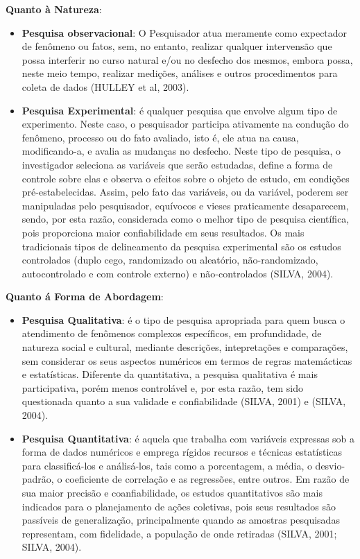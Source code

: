 \textbf{Quanto à Natureza}: 

\begin{itemize}
\item \textbf{Pesquisa observacional}: O Pesquisador atua meramente como expectador de fenômeno ou fatos, sem, no entanto, realizar qualquer intervensão que possa interferir no curso natural e/ou no desfecho dos mesmos, embora possa, neste meio tempo, realizar medições, análises e outros procedimentos para coleta de dados (HULLEY et al, 2003).
\item \textbf{Pesquisa Experimental}: é qualquer pesquisa que envolve algum tipo de experimento. Neste caso, o pesquisador participa ativamente na condução do fenômeno, processo ou do fato avaliado, isto é, ele atua na causa, modificando-a, e avalia as mudanças no desfecho. Neste tipo de pesquisa, o investigador seleciona as variáveis que serão estudadas, define a forma de controle sobre elas e observa o efeitos sobre o objeto de estudo, em condições pré-estabelecidas. Assim, pelo fato das variáveis, ou da variável, poderem ser manipuladas pelo pesquisador, equívocos e vieses praticamente  desaparecem, sendo, por esta razão, considerada como o melhor tipo de pesquisa científica, pois proporciona maior confiabilidade em seus resultados. Os mais tradicionais tipos de delineamento da pesquisa experimental são os estudos controlados (duplo cego, randomizado ou aleatório, não-randomizado, autocontrolado e com controle externo) e não-controlados (SILVA, 2004). 
\end{itemize}


\textbf{Quanto á Forma de Abordagem}: 

\begin{itemize}
\item \textbf{Pesquisa Qualitativa}: é o tipo de pesquisa apropriada para quem busca o atendimento de fenômenos complexos específicos, em profundidade, de natureza social e cultural, mediante descrições, intepretações e comparações, sem considerar os seus aspectos numéricos em termos de regras matemácticas e estatísticas. Diferente da quantitativa, a pesquisa qualitativa é mais participativa, porém menos controlável e, por esta razão, tem sido questionada quanto a sua validade e confiabilidade (SILVA, 2001) e (SILVA, 2004).
\item \textbf{Pesquisa Quantitativa}: é aquela que trabalha com variáveis expressas sob a forma de dados numéricos e emprega rígidos recursos e técnicas estatísticas para classificá-los e análisá-los, tais como a porcentagem, a média, o desvio-padrão, o coeficiente de correlação e as regressões, entre outros. Em razão de sua maior precisão e coanfiabilidade, os estudos quantitativos são mais indicados para o planejamento de ações coletivas, pois seus resultados são passíveis de generalização, principalmente quando as amostras pesquisadas representam, com fidelidade, a população de onde retiradas (SILVA, 2001; SILVA, 2004).
\end{itemize}


